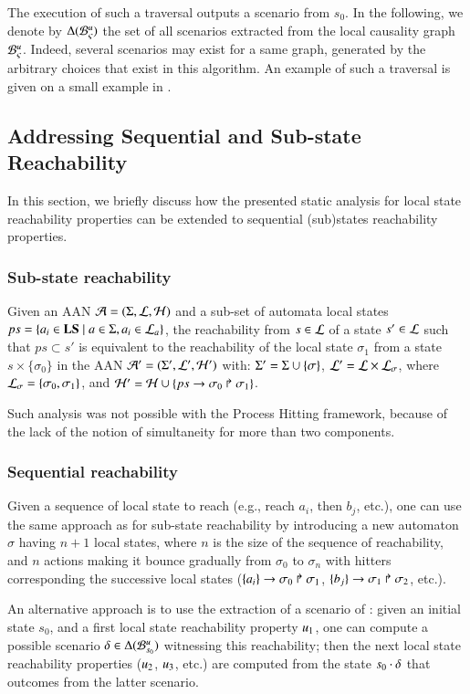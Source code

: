 The execution of such a traversal outputs a scenario from $s_0$.
In the following, we denote by $\Delta({\mathcal{B}_{\varsigma}^{u}})$ the set of all scenarios extracted from the
local causality graph ${\mathcal{B}_{\varsigma}^{u}}$.
Indeed, several scenarios may exist for a same graph,
generated by the arbitrary choices that exist in this algorithm.
An example of such a traversal is given on a small example
in .



\subsection{Addressing Sequential and Sub-state Reachability}
\label{ssec:ordered-ua}
\label{ssec:simult-ua}

\newcommand{\total}{\tau}
\newcommand{\reach}{\sigma}

In this section, we briefly discuss how the presented static analysis for local
state reachability properties can be extended to sequential (sub)states
reachability properties.

\subsubsection*{Sub-state reachability}
Given an AAN $\mathcal{A} = (\Sigma, \mathcal{L}, \mathcal{H})$ and
a sub-set of automata local states
$ps = \{ a_i \in\mathbf{LS}\mid a\in\Sigma, a_i\in\mathcal{L}_a\}$,
the reachability from $s\in\mathcal{L}$ of a state $s'\in\mathcal{L}$ such that
$ps\subset s'$ is equivalent to the reachability of the local state
$\reach_1$ from a state $s \times \{ \reach_0 \}$
in the AAN
$\mathcal{A}' = (\Sigma', \mathcal{L}', \mathcal{H}')$ with:
$\PHs' = \PHs \cup \{ \reach \}$, $\PHl' = \PHl \times \PHl_\reach$,
where $\PHl_\reach = \{ \reach_0, \reach_1 \}$,
and $\PHh' = \PHh \cup \{ \PHhit{ps}{\reach_0}{\reach_1} \}$.

Such analysis was not possible with the Process Hitting framework,
because of the lack of the notion of simultaneity for more than two components.


\subsubsection*{Sequential reachability}
Given a sequence of local state to reach (e.g., reach $a_i$, then $b_j$, etc.),
one can use the same approach as for sub-state reachability by introducing
a new automaton $\reach$ having $n+1$ local states, where $n$ is the size of the
sequence of reachability, and $n$ actions making it bounce gradually from $\reach_0$ to
$\reach_n$ with hitters corresponding the successive local states
(\eg $\PHfrappes{a_i}{\reach_0}{\reach_1}$,
$\PHfrappes{b_j}{\reach_1}{\reach_2}$, etc.).

An alternative approach is to use the extraction of a scenario of
:
given an initial state $s_0$, and a first local state reachability property $u_1$,
one can compute a possible scenario $\delta \in \Delta({\mathcal{B}_{s_0}^{u}})$
witnessing this reachability;
then the next local state reachability properties ($u_2$, $u_3$, etc.)
are computed from the
state $s_0 \cdot \delta$ that outcomes from the latter scenario.
